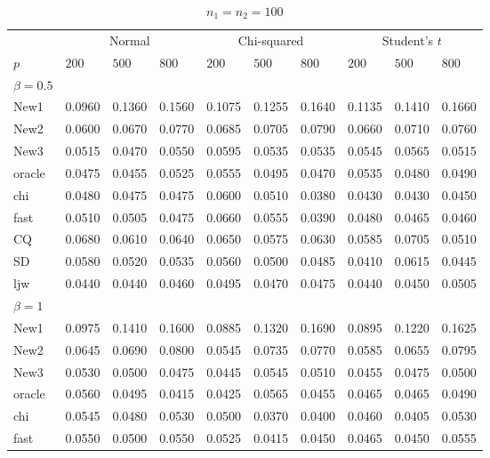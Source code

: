 \documentclass[review]{elsarticle}
\theoremstyle{plain}
\theoremstyle{definition}
\theoremstyle{remark}
\begin{document}
\begin{table}[ht]
\caption{$n_1=n_2=100$} 
\label{hahaha}
\vspace{3mm}
\centering
\begin{tabular}{llllllllll}
\toprule
    &   \multicolumn{3}{c}{Normal} & \multicolumn{3}{c}{Chi-squared}& \multicolumn{3}{c}{Student's $t$}  \\
    \cmidrule(r){2-4}
\cmidrule(r){5-7}
\cmidrule(r){8-10}
    $p$ & $200$ &  $500$ & $800$ & $200$  & $500$ & $800$ & $200$ & $500$ & $800$ \\ 
\midrule
    $\beta=0.5$\\
New1 & 0.0960 & 0.1360 & 0.1560 & 0.1075 & 0.1255 & 0.1640 & 0.1135 & 0.1410 & 0.1660 \\ 
New2 & 0.0600 & 0.0670 & 0.0770 & 0.0685 & 0.0705 & 0.0790 & 0.0660 & 0.0710 & 0.0760 \\ 
New3 & 0.0515 & 0.0470 & 0.0550 & 0.0595 & 0.0535 & 0.0535 & 0.0545 & 0.0565 & 0.0515 \\ 
oracle & 0.0475 & 0.0455 & 0.0525 & 0.0555 & 0.0495 & 0.0470 & 0.0535 & 0.0480 & 0.0490 \\ 
chi & 0.0480 & 0.0475 & 0.0475 & 0.0600 & 0.0510 & 0.0380 & 0.0430 & 0.0430 & 0.0450 \\ 
fast & 0.0510 & 0.0505 & 0.0475 & 0.0660 & 0.0555 & 0.0390 & 0.0480 & 0.0465 & 0.0460 \\ 
CQ & 0.0680 & 0.0610 & 0.0640 & 0.0650 & 0.0575 & 0.0630 & 0.0585 & 0.0705 & 0.0510 \\ 
SD & 0.0580 & 0.0520 & 0.0535 & 0.0560 & 0.0500 & 0.0485 & 0.0410 & 0.0615 & 0.0445 \\ 
ljw & 0.0440 & 0.0440 & 0.0460 & 0.0495 & 0.0470 & 0.0475 & 0.0440 & 0.0450 & 0.0505 \\ 
    $\beta=1$\\
New1 & 0.0975 & 0.1410 & 0.1600 & 0.0885 & 0.1320 & 0.1690 & 0.0895 & 0.1220 & 0.1625 \\ 
New2 & 0.0645 & 0.0690 & 0.0800 & 0.0545 & 0.0735 & 0.0770 & 0.0585 & 0.0655 & 0.0795 \\ 
New3 & 0.0530 & 0.0500 & 0.0475 & 0.0445 & 0.0545 & 0.0510 & 0.0455 & 0.0475 & 0.0500 \\ 
oracle & 0.0560 & 0.0495 & 0.0415 & 0.0425 & 0.0565 & 0.0455 & 0.0465 & 0.0465 & 0.0490 \\ 
chi & 0.0545 & 0.0480 & 0.0530 & 0.0500 & 0.0370 & 0.0400 & 0.0460 & 0.0405 & 0.0530 \\ 
fast & 0.0550 & 0.0500 & 0.0550 & 0.0525 & 0.0415 & 0.0450 & 0.0465 & 0.0450 & 0.0555 \\ 

\end{tabular}
\end{table}
\end{document}
